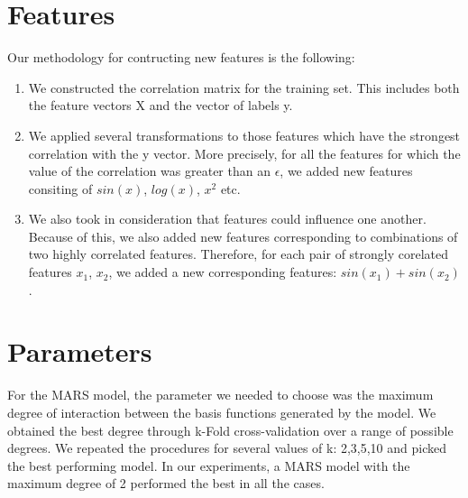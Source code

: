 \documentclass[a4paper, 11pt]{article}
\begin{document}
\section{Features}
Our methodology for contructing new features is the following:  
\begin{enumerate}
    \item We constructed the correlation matrix for the training set. This includes both the feature vectors X and the vector of labels y.
    \item We applied several transformations to those features which have the strongest correlation with the y vector. More precisely, for all the features for which the value of the correlation was greater than an $\epsilon$, we added new features consiting of $sin(x)$, $log(x)$, $x^2$ etc.
    \item We also took in consideration that features could influence one another. Because of this, we also added new features corresponding to combinations of two highly correlated features. Therefore, for each pair of strongly corelated features $x_1$, $x_2$, we added a new corresponding features: $sin(x_1) + sin(x_2)$.
    
\end{enumerate}

\section{Parameters}

For the MARS model, the parameter we needed to choose was the maximum degree of interaction between the basis functions generated by the model. We obtained the best degree through k-Fold cross-validation over a range of possible degrees. We repeated the procedures for several values of k: 2,3,5,10 and picked the best performing model. In our experiments, a MARS model with the maximum degree of 2 performed the best in all the cases.
\end{document}
